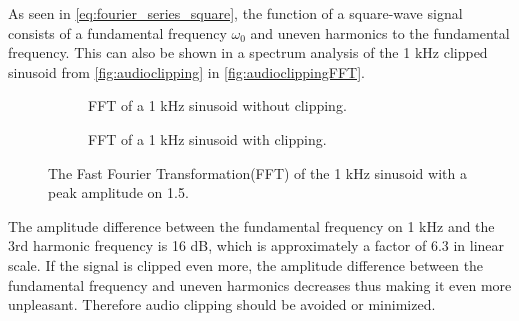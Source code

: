 As seen in \autoref{eq:fourier_series_square}, the function of a square-wave signal consists of a fundamental frequency $\omega_0$ and uneven harmonics to the fundamental frequency. This can also be shown in a spectrum analysis of the 1 kHz clipped sinusoid from \autoref{fig:audioclipping} in \autoref{fig:audioclippingFFT}.

\begin{figure}[H]
\centering
\begin{subfigure}[t]{0.47\textwidth}
	
	\caption{FFT of a 1 kHz sinusoid without clipping.}
	\label{fig:clippingCleanFFT}
\end{subfigure}
\hspace{6mm} 
\begin{subfigure}[t]{0.47\textwidth}
	
	\caption{FFT of a 1 kHz sinusoid with clipping.}
	\label{fig:clippingDistFFT}
\end{subfigure}
\caption{The Fast Fourier Transformation(FFT) of the 1 kHz sinusoid with a peak amplitude on 1.5. }
\label{fig:audioclippingFFT}
\end{figure}

The amplitude difference between the fundamental frequency on 1 kHz and the 3rd harmonic frequency is 16 dB, which is approximately a factor of 6.3 in linear scale. If the signal is clipped even more, the amplitude difference between the fundamental frequency and uneven harmonics decreases thus making it even more unpleasant. Therefore audio clipping should be avoided or minimized.










